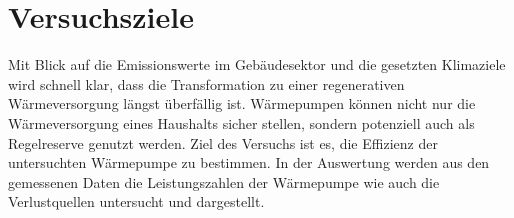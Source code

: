 \section{Versuchsziele}

Mit Blick auf die Emissionswerte im Gebäudesektor und die gesetzten Klimaziele wird schnell klar, 
dass die Transformation zu einer regenerativen Wärmeversorgung längst überfällig ist.
Wärmepumpen können nicht nur die Wärmeversorgung eines Haushalts sicher stellen, sondern potenziell auch als Regelreserve genutzt werden. 
Ziel des Versuchs ist es, die Effizienz der untersuchten Wärmepumpe zu bestimmen. In der Auswertung werden aus den gemessenen Daten die Leistungszahlen der Wärmepumpe wie auch die Verlustquellen untersucht und dargestellt.




